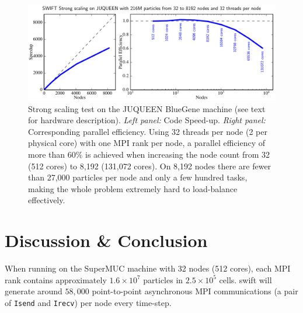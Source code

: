 \documentclass{sig-alternate-05-2015}
\newcommand{\swift}{{\sc swift}\xspace}
\begin{document}
\begin{figure}
\centering
\includegraphics[width=\textwidth]{Figures/scalingBlueGene}
\caption{Strong scaling test on the JUQUEEN BlueGene machine (see text
  for hardware description). \textit{Left panel:} Code
  Speed-up. \textit{Right panel:} Corresponding parallel efficiency.
  Using 32 threads per node (2 per physical core) with one MPI rank
  per node, a parallel efficiency of more than $60\%$ is achieved when
  increasing the node count from 32 (512 cores) to 8,192 (131,072
  cores). On 8,192 nodes there are fewer than 27,000 particles per
  node and only a few hundred tasks, making the whole problem
  extremely hard to load-balance effectively.
  \label{fig:JUQUEEN2}}
\end{figure}






\section{Discussion \& Conclusion}



When running on the SuperMUC machine with 32 nodes (512 cores), each MPI rank
contains approximately $1.6\times10^7$ particles in $2.5\times10^5$
cells. \swift will generate around $58,000$ point-to-point asynchronous MPI
communications (a pair of \texttt{Isend} and \texttt{Irecv}) per node every
time-step. 


\end{document}
